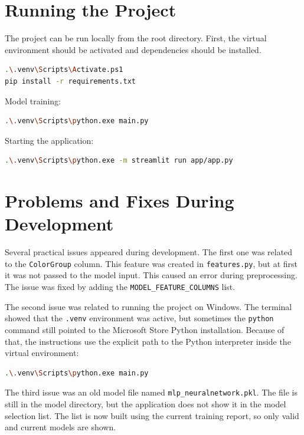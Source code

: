 \documentclass[12pt,a4paper]{article}
\begin{document}
\section{Running the Project}

The project can be run locally from the root directory. First, the virtual environment should be activated and dependencies should be installed.

\begin{lstlisting}[language=bash, caption={Installing dependencies}]
.\.venv\Scripts\Activate.ps1
pip install -r requirements.txt
\end{lstlisting}

Model training:

\begin{lstlisting}[language=bash, caption={Training the models}]
.\.venv\Scripts\python.exe main.py
\end{lstlisting}

Starting the application:

\begin{lstlisting}[language=bash, caption={Starting the application}]
.\.venv\Scripts\python.exe -m streamlit run app/app.py
\end{lstlisting}

\section{Problems and Fixes During Development}

Several practical issues appeared during development. The first one was related to the \texttt{ColorGroup} column. This feature was created in \texttt{features.py}, but at first it was not passed to the model input. This caused an error during preprocessing. The issue was fixed by adding the \texttt{MODEL\_FEATURE\_COLUMNS} list.

The second issue was related to running the project on Windows. The terminal showed that the \texttt{.venv} environment was active, but sometimes the \texttt{python} command still pointed to the Microsoft Store Python installation. Because of that, the instructions use the explicit path to the Python interpreter inside the virtual environment:

\begin{lstlisting}[language=bash, caption={Safe execution using Python from the virtual environment}]
.\.venv\Scripts\python.exe main.py
\end{lstlisting}

The third issue was an old model file named \texttt{mlp\_neuralnetwork.pkl}. The file is still in the model directory, but the application does not show it in the model selection list. The list is now built using the current training report, so only valid and current models are shown.
\end{document}
